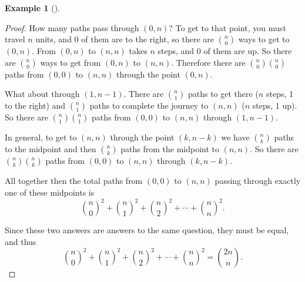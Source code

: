 \documentclass[10pt,]{book}
\theoremstyle{plain}
\theoremstyle{definition}
\newtheorem{example}[theorem]{Example}
\theoremstyle{definition}
\theoremstyle{definition}
\numberwithin{equation}{chapter}
\begin{document}
\begin{example}[]
\begin{proof}
            How many paths pass through \((0,n)\)? To get to that point, you must travel \(n\) units, and \(0\) of them are to the right, so there are \({n \choose 0}\) ways to get to \((0,n)\). From \((0,n)\) to \((n,n)\) takes \(n\) steps, and \(0\) of them are up. So there are \({n \choose 0}\) ways to get from \((0,n)\) to \((n,n)\). Therefore there are \({n \choose 0}{n \choose 0}\) paths from \((0,0)\) to \((n,n)\) through the point \((0,n)\).
\par

            What about through \((1,n-1)\). There are \({n \choose 1}\) paths to get there (\(n\) steps, 1 to the right) and \({n \choose 1}\) paths to complete the journey to \((n,n)\) (\(n\) steps, \(1\) up). So there are \({n \choose 1}{n \choose 1}\) paths from \((0,0)\) to \((n,n)\) through \((1,n-1)\).
\par

            In general, to get to \((n,n)\) through the point \((k,n-k)\) we have \({n \choose k}\) paths to the midpoint and then \({n \choose k}\) paths from the midpoint to \((n,n)\). So there are \({n \choose k}{n \choose k}\) paths from \((0,0)\) to \((n,n)\) through \((k, n-k)\).
\par

            All together then the total paths from \((0,0)\) to \((n,n)\) passing through exactly one of these midpoints is
            \begin{equation*}
              {n \choose 0}^2 + {n \choose 1}^2 + {n \choose 2}^2 + \cdots + {n \choose n}^2.
            \end{equation*}
\par

            Since these two answers are answers to the same question, they must be equal, and thus
            \begin{equation*}
              {n \choose 0}^2 + {n \choose 1}^2 + {n \choose 2}^2 + \cdots + {n \choose n}^2 = {2n \choose n}.
            \end{equation*}
\end{proof}
\end{example}
\typeout{************************************************}
\typeout{************************************************}
\end{document}
